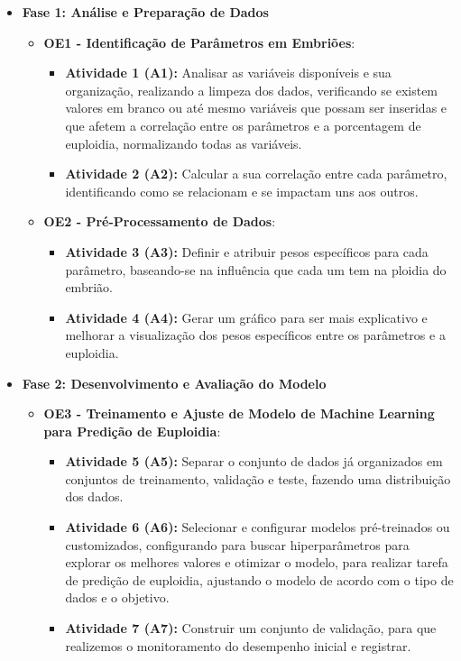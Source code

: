 \begin{itemize}
    \item \textbf{Fase 1: Análise e Preparação de Dados}
    \begin{itemize}
        \item \textbf{OE1 - Identificação de Parâmetros em Embriões}: 
        \begin{itemize}
            \item \textbf{Atividade 1 (A1):} Analisar as variáveis disponíveis e sua organização, realizando a limpeza dos dados, verificando se existem valores em branco ou até mesmo variáveis que possam ser inseridas e que afetem a correlação entre os parâmetros e a porcentagem de euploidia, normalizando todas as variáveis. 
            \item \textbf{Atividade 2 (A2):} Calcular a sua correlação entre cada parâmetro, identificando como se relacionam e se impactam uns aos outros.
        \end{itemize}

        \item \textbf{OE2 - Pré-Processamento de Dados}: 
        \begin{itemize}
            \item \textbf{Atividade 3 (A3):} Definir e atribuir pesos específicos para cada parâmetro, baseando-se na influência que cada um tem na ploidia do embrião.
            \item \textbf{Atividade 4 (A4):}  Gerar um gráfico para ser mais explicativo e melhorar a visualização dos pesos específicos entre os parâmetros e a euploidia.
        \end{itemize}
    \end{itemize}
    
    \item \textbf{Fase 2: Desenvolvimento e Avaliação do Modelo}
    \begin{itemize}
        \item \textbf{OE3 - Treinamento e Ajuste de Modelo de Machine Learning para Predição de Euploidia}: 
        \begin{itemize}
            \item \textbf{Atividade 5 (A5):} Separar o conjunto de dados já organizados em conjuntos de treinamento, validação e teste, fazendo uma distribuição dos dados.
            \item \textbf{Atividade 6 (A6):} Selecionar e configurar modelos pré-treinados ou customizados, configurando para buscar hiperparâmetros para explorar os melhores valores e otimizar o modelo, para realizar tarefa de predição de euploidia, ajustando o modelo de acordo com o tipo de dados e o objetivo.
            \item \textbf{Atividade 7 (A7):} Construir um conjunto de validação, para que realizemos o monitoramento do desempenho inicial e registrar.
        \end{itemize}


\end{itemize}
\end{itemize}

